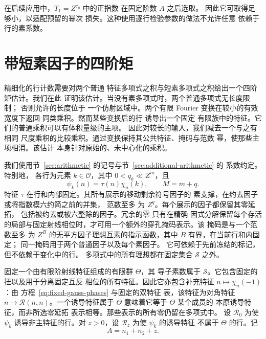 在后续应用中，\(T_1=Z^{\tau_\eta}\) 中的正指数
在固定阶数 \(A\) 之后选取。
因此它可取得足够小，以适配预留的幂次
损失。这种使用逐行检验参数的做法不允许任意
依赖于行的素系数。

\section{带短素因子的四阶矩}\label{sec:plain}

精细化的行计数需要对两个普通
特征多项式之积与短素多项式之积给出一个四阶矩估计。我们在此
证明该估计。当没有素多项式时，两个普通多项式无长度限制；
否则允许的长度位于
一个仿射区域中。两个有限 Fourier 变换在较小的有效宽度下返回
同类乘积。然而某些变换后的行
诱导出一个固定
有限族中的特征。它们的普通乘积可以有体积量级的主项。
因此对较长的输入，我们减去一个与之有相同
尺度乘积的比较乘积。通过变换保持其公共特征、掩码与范数
幂，使那些主项相消。该估计
本身针对原始的、未中心化的乘积。

我们使用节~\ref{sec:arithmetic} 的记号与节~\ref{sec:additional-arithmetic} 的
系数约定。特别地，
各行为元素 \(k\in\mathcal O\)，其中 \(0<q_k\ll Z^m\)，且
\[
 \psi_k(n)=\tau(n)\chi_n(k),\qquad M=m+q.
\]
特征 \(\tau\) 在行和内部固定。其所有展示的移动剩余符号因子的
素支撑，在约去因子或将指数模六约简之前的并集，
范数至多
为 \(Z^q\)。每个展示的因子都保留其零延拓，
包括被约去或被六整除的因子。冗余的零
只有在精确
因式分解保留每个存活的局部与固定射线相位时，才可用一个额外的穿孔掩码表示。该
掩码是与一个范数至多
为 \(Z^B\) 的无平方因子理想互素的指示函数，其中 \(B\) 有界，在当前行和内固定；
同一掩码用于两个普通因子以及每个素因子。
它可依赖于先前冻结的标记，但不依赖于变化中的行。
多项式中的所有理想都在固定集合 \(\mathcal S\) 之外。

固定一个由有限阶射线特征组成的有限群 \(\Theta\)，其
导子素数属于 \(\mathcal S\)。它包含固定的
扭以及用于分离固定互反
相位的所有特征。因此它亦包含补充特征
\(n\mapsto\chi_n(-1)\)：由
方程~\eqref{eq:fixed-gauss-phases} 与固定的双特征
表，该特征为对角特征
\(n\mapsto\mathcal R(n,n)\)。一个诱导特征属于
\(\Theta\) 意味着它等于 \(\Theta\) 某个成员的
本原诱导特征，而非所选零延拓
表示相等。那些表示的所有零仍留在多项式中。
设 \(\mathcal R_0\) 为使
\(\psi_k\) 诱导非主特征的行。对 \(z>0\)，设
\(\mathcal R_z\) 为使 \(\psi_k\) 的诱导特征
不属于 \(\Theta\) 的行。记
\begin{equation}
 A=n_1+n_2+z.
 \label{old-eq:3.1}
\end{equation}

